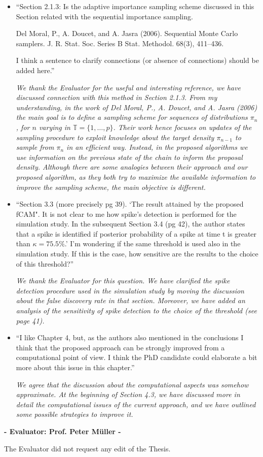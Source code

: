 \documentclass[11pt]{letter}
\begin{document}
\begin{itemize}
%
\item ``Section 2.1.3:
Is the adaptive importance sampling scheme discussed in this Section related with the sequential importance
sampling.

Del Moral, P., A. Doucet, and A. Jasra (2006). Sequential Monte Carlo samplers. J. R. Stat. Soc. Series B Stat. Methodol. 68(3), 411–436.

I think a sentence to clarify connections (or absence of connections) should be added here.''\vskip1mm

{\em 
	We thank the Evaluator for the useful and interesting reference, we have discussed connection with this method in Section 2.1.3. From my understanding, in the work of Del Moral, P., A. Doucet, and A. Jasra (2006) the main goal is to define a sampling scheme for sequences of distributions $\pi_n$, for $n$ varying in $\mathbb{T} = \{1,\dots,p\}$. Their work hence focuses on updates of the sampling procedure to exploit knowledge about the target density $\pi_{n-1}$ to sample from $\pi_n$ in an efficient way. Instead, in the proposed algorithms we use information on the previous state of the chain to inform the proposal density. Although there are some analogies between their approach and our proposed algorithm, as they both try to maximize the available information to improve the sampling scheme, the main objective is different.
	
}
\vskip3mm

%
\item ``Section 3.3 (more precisely pg 39). `The result attained by the proposed fCAM".
It is not clear to me how spike's detection is performed for the simulation study. In the subsequent Section 3.4 (pg 42), the author states that a spike is identified if posterior probability of a spike at time t is greater than $\kappa=75.5\%$.'
I'm wondering if the same threshold is used also in the simulation study. If this is the case, how sensitive are the results to the choice of this threshold?''\vskip1mm

{\em 
	We thank the Evaluator for this question. We have clarified the spike detection procedure used in the simulation study by moving the discussion about the false discovery rate in that section. Moreover, we have added an analysis of the sensitivity of spike detection to the choice of the threshold (see page 41).
}
\vskip3mm

%
\item ``I like Chapter 4, but, as the authors also mentioned in the conclusions I think that the proposed approach can be strongly improved from a computational point of view. I think the PhD candidate could elaborate a bit more about this issue in this chapter.''\vskip1mm

{\em 
	We agree that the discussion about the computational aspects was somehow approximate. At the beginning of Section 4.3, we have discussed more in detail the computational issues of the current approach, and we have outlined some possible strategies to improve it.
}
\vskip3mm



\end{itemize}
\vskip10mm
\begin{center}
{\large\bf - Evaluator: Prof. Peter M\"uller -}
\end{center}

The Evaluator did not request any edit of the Thesis.

%
\end{document}
